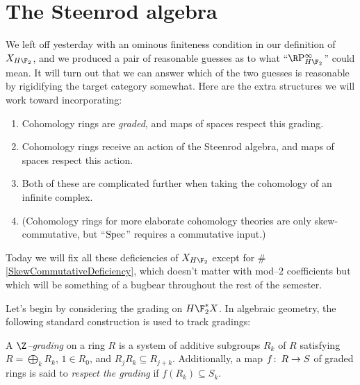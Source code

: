 \section{The Steenrod algebra}\label{TheSteenrodAlgebraSection}

We left off yesterday with an ominous finiteness condition in our definition of $X_{H\F_2}$, and we produced a pair of reasonable guesses as to what ``$\RP^\infty_{H\F_2}$'' could mean.  It will turn out that we can answer which of the two guesses is reasonable by rigidifying the target category somewhat.  Here are the extra structures we will work toward incorporating:
\begin{enumerate}
\item Cohomology rings are \emph{graded}, and maps of spaces respect this grading.
\item Cohomology rings receive an action of the Steenrod algebra, and maps of spaces respect this action.
\item Both of these are complicated further when taking the cohomology of an infinite complex.
\item \label{SkewCommutativeDeficiency} (Cohomology rings for more elaborate cohomology theories are only skew-commutative, but ``$\operatorname{Spec}$'' requires a commutative input.)
\end{enumerate}
Today we will fix all these deficiencies of $X_{H\F_2}$ except for \#\ref{SkewCommutativeDeficiency}, which doesn't matter with mod--$2$ coefficients but which will be something of a bugbear throughout the rest of the semester.

Let's begin by considering the grading on $H\F_2^* X$.  In algebraic geometry, the following standard construction is used to track gradings:

\begin{definition}
A \textit{$\Z$--grading} on a ring $R$ is a system of additive subgroups $R_k$ of $R$ satisfying $R = \bigoplus_k R_k$, $1 \in R_0$, and $R_j R_k \subseteq R_{j+k}$.  Additionally, a map $f\colon\thinspace R \to S$ of graded rings is said to \textit{respect the grading} if $f(R_k) \subseteq S_k$.
\end{definition}

